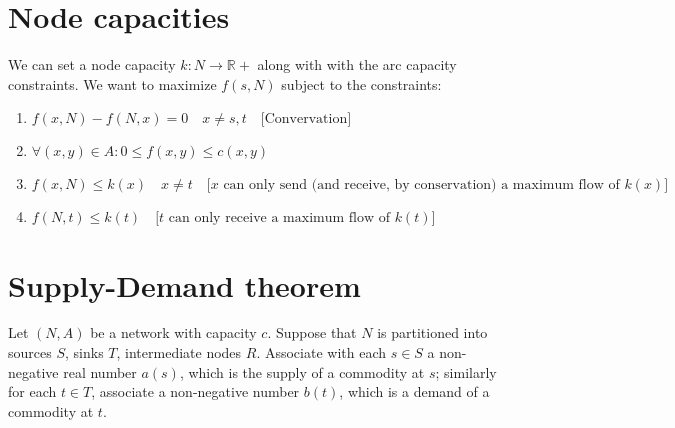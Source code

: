 \documentclass[titlepage]{article}
\newcommand{\R}{\mathbb{R}}
\theoremstyle{plain}
\theoremstyle{definition}
\theoremstyle{remark}
\begin{document}
\section{Node capacities}

We can set a node capacity $k: N \rightarrow \R+$ along with with the 
arc capacity constraints. We want to maximize $f(s, N)$ subject to the
constraints:

\begin{enumerate}
    \item $f(x, N) - f(N, x) = 0 \quad x \neq s, t \quad \text{[Convervation]}$
    \item $\forall (x, y) \in A: 0 \leq f(x, y) \leq c(x, y) \quad $ 
    \item $f(x, N) \leq k(x) \quad x \neq t \quad \text{[$x$ can only send (and receive, by conservation) a maximum flow of $k(x)$]}$
    \item $f(N, t)  \leq k(t) \quad \text{[$t$ can only receive a maximum flow of $k(t)$]}$
\end{enumerate}


\section{Supply-Demand theorem}

Let $(N, A)$ be a network with capacity $c$. Suppose that $N$ is partitioned into
sources $S$, sinks $T$, intermediate nodes $R$. Associate with each $s \in S$
a non-negative real number $a(s)$, which is the supply of a commodity at $s$;
similarly for each $t \in T$, associate a non-negative number $b(t)$, which
is a demand of a commodity at $t$.



\nocite{*}
\end{document}
